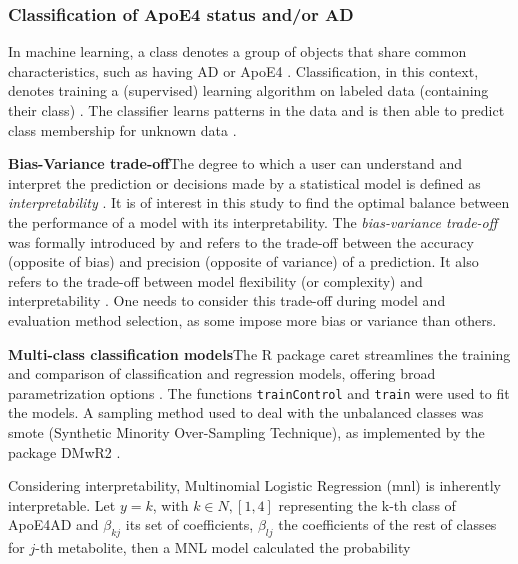 \documentclass{amsart}
\begin{document}
\subsubsection{Classification of ApoE4 status and/or AD}\label{rq2}
In machine learning, a class denotes a group of objects that share common characteristics, such as having AD or ApoE4 \cite*{Drummond2010}. Classification, in this context, denotes training a (supervised) learning algorithm on labeled data (containing their class) \cite*{Drummond2010}. The classifier learns patterns in the data and is then able to predict class membership for unknown data \cite*{Drummond2010}.

\leavevmode\newline \textbf{Bias-Variance trade-off}\hspace{.25cm}The degree to which a user can understand and interpret the prediction or decisions made by a statistical model is defined as \textit{interpretability} \cite{Elshawi2019OnHypertension}. It is of interest in this study to find the optimal balance between the performance of a model with its interpretability. The \textit{bias-variance trade-off} was formally introduced by \citeauthor{Geman1992NeuralDilemma} and refers to the trade-off between the accuracy (opposite of bias) and precision (opposite of variance) of a prediction. It also refers to the trade-off between model flexibility (or complexity) and interpretability \cite{Geman1992NeuralDilemma}. One needs to consider this trade-off during model and evaluation method selection, as some impose more bias or variance than others.

\leavevmode\newline \textbf{Multi-class classification models}\hspace{.25cm}The R package \textsf{caret} streamlines the training and comparison of classification and regression models, offering broad parametrization options \cite{Kuhn2008BuildingPackage}. The functions \texttt{trainControl} and \texttt{train} were used to fit the models. A sampling method used to deal with the unbalanced classes was \acrshort{smote} (Synthetic Minority Over-Sampling Technique), as implemented by the package \textsf{DMwR2} \cite{DMwR2}.

Considering interpretability, Multinomial Logistic Regression (\acrshort{mnl}) is inherently interpretable. Let $y = k$, with $k \in N, [1,4]$ representing the k-th class of ApoE4AD and $\beta_{kj}$ its set of coefficients,  $\beta_{lj}$ the coefficients of the rest of classes for $j$-th metabolite, then a MNL model calculated the probability
\end{document}
